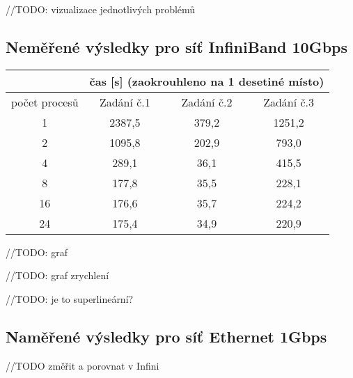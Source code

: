 \documentclass[12pt]{article}
\begin{document}
//TODO: vizualizace jednotlivých problémů



\subsection{Neměřené výsledky pro síť InfiniBand 10Gbps}

\begin{tabular}{|c|c|c|c|}
\hline 
 & \multicolumn{3}{c|}{čas [s] (zaokrouhleno na 1 desetiné místo)} \\ 
\hline 
počet procesů & Zadání č.1 & Zadání č.2 & Zadání č.3 \\ 
\hline 
1 & 2387,5 & 379,2 & 1251,2 \\ 
\hline 
2 & 1095,8 & 202,9 & 793,0 \\ 
\hline 
4 & 289,1 & 36,1 & 415,5 \\ 
\hline 
8 & 177,8 & 35,5 & 228,1 \\ 
\hline 
16 & 176,6 & 35,7 & 224,2 \\ 
\hline 
24 & 175,4 & 34,9 & 220,9 \\ 
\hline 
\end{tabular} 



//TODO: graf

//TODO: graf zrychlení

//TODO: je to superlineární?




\subsection{Naměřené výsledky pro síť Ethernet 1Gbps}

//TODO změřit a porovnat v Infini
\end{document}
